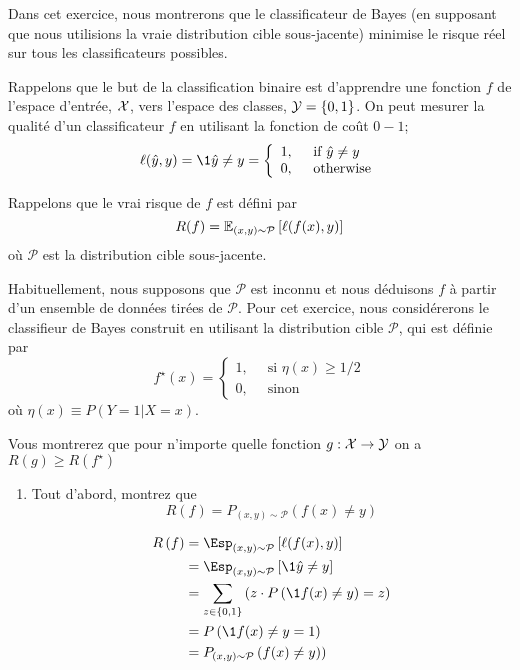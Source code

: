 {
	Dans cet exercice, nous montrerons que le classificateur de Bayes (en supposant que nous utilisions la vraie distribution cible sous-jacente) minimise le risque réel sur tous les classificateurs possibles.

	Rappelons que le but de la classification binaire est d'apprendre une fonction $f$ de l'espace d'entrée, ${\mathcal X}$, vers l'espace des classes, ${\mathcal Y}=\{0,1\}$.
	On peut mesurer la qualité d'un classificateur $f$ en utilisant la fonction de coût $0-1$; \ie
	$$\ell(\hat{y},y) = \1{\hat{y}\neq y} = \left\{ \begin{array}{ll}
			1, \;\; & \text{if } \hat{y}\neq y \\
			0, \;\; & \text{otherwise}\end{array}
		\right.$$

	Rappelons que le vrai risque de $f$ est défini par
	$$R(f) = \mathbb{E}_{(x,y)\sim \mathcal{P}}\left[\ell(f(x),y)\right]$$
	où $\mathcal{P}$ est la distribution cible sous-jacente.

	Habituellement, nous supposons que $\mathcal{P}$ est inconnu et nous déduisons $f$ à partir d'un ensemble de données tirées de $\mathcal{P}$. Pour cet exercice, nous considérerons
	le classifieur de Bayes construit en utilisant la distribution cible $\mathcal{P}$, qui est définie par
	$$f^{\star}(x) = \left\{ \begin{array}{ll}
			1,\;\; & \text{si }\eta(x) \geq 1/2 \\
			0,\;\; & \text{sinon}\end{array}
		\right.$$
	où
	$\eta(x) \equiv P(Y=1 | X=x).$

	\medskip

	Vous montrerez que pour n'importe quelle fonction $g:{\mathcal X}\to{\mathcal Y}$ on a $R(g) \geq R(f^{\star})$

	\begin{enumerate}
		\item Tout d'abord, montrez que
		      \begin{equation} \label{eq:a} \tag{a}
			      R(f) = P_{(x,y)\sim \mathcal{P}}(f(x)\neq y)
		      \end{equation}

		      \begin{reponse}
			      \begin{align*}
				      R\left( f \right)
				       & =
				      \Esp_{(x,y) \sim \mathcal{P}}\left[\ell(f(x), y)\right]
				      \\
				       & =
				      \Esp_{(x,y) \sim \mathcal{P}}\left[\1{\hat{y} \neq y}\right]
				      \\
				       & =
				      \sum_{z \in \{0,1\}}\left(z \cdot P\left(\1{f(x) \neq y}\right) = z\right)
				      \\
				       & =
				      P\left(\1{f(x) \neq y } = 1 \right)
				      \\
				       & =
				      P_{\left(x,y\right) \sim \mathcal{P}}\left(f(x) \neq y)\right)
			      \end{align*}
		      \end{reponse}


\end{enumerate}}
